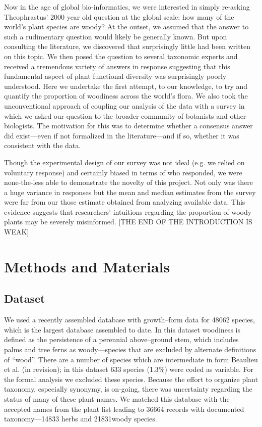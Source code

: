 \documentclass[12pt]{article}
\begin{document}
Now in the age of global bio-informatics, we were interested in simply re-asking Theophrastus' 2000 year old question at the global scale: how many of the world's plant species are woody? At the outset, we assumed that the answer to such a rudimentary question would likely be generally known. But upon consulting the literature, we discovered that surprisingly little had been written on this topic. We then posed the question to several taxonomic experts and received a tremendous variety of answers in response suggesting that this fundamental aspect of plant functional diversity was surprisingly poorly understood. Here we undertake the first attempt, to our knowledge, to try and quantify the proportion of woodiness across the world's flora. We also took the unconventional approach of coupling our analysis of the data with a survey in which we asked our question to the broader community of botanists and other biologists. The motivation for this was to determine whether a consensus answer did exist---even if not formalized in the literature---and if so, whether it was consistent with the data.

Though the experimental design of our survey was not ideal (e.g. we relied on voluntary response) and certainly biased in terms of who responded, we were none-the-less able to demonstrate the novelty of this project. Not only was there a huge variance in responses but the mean and median estimates from the survey were far from our those estimate obtained from analyzing available data. This evidence suggests that researchers' intuitions regarding the proportion of woody plants may be severely misinformed. [THE END OF THE INTRODUCTION IS WEAK]

\section{Methods and Materials}

\subsection{Dataset}

We used a recently assembled database with growth--form data for 48062 species, which is the largest database assembled to date.  In this dataset woodiness is defined as the persistence of a perennial above--ground stem, which includes palms and tree ferns as woody---species that are excluded by alternate definitions of ``wood''.  There are a number of species which are intermediate in form Beaulieu et al. (in revision); in this dataset 633 species (1.3\%) were coded as variable.  For the formal analysis we excluded these species.  Because the effort to organize plant taxonomy, especially synonymy, is on-going, there was uncertainty regarding the status of many of these plant names.  We matched this database with the accepted names from the plant list leading to 36664 records with documented taxonomy---14833 herbs and 21831woody species.  
\end{document}
